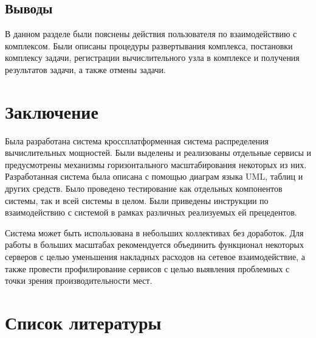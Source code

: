 \documentclass[a4paper,12pt]{report}
\numberwithin{equation}{section}
\begin{document}
  \subsection{Выводы}
  В данном разделе были пояснены действия пользователя по взаимодействию с комплексом. 
  Были описаны процедуры развертывания комплекса, постановки комплексу задачи, регистрации вычислительного узла в комплексе и получения результатов задачи, а также отмены задачи.
  
  \clearpage
  \section{Заключение}
  Была разработана система кроссплатформенная система распределения вычислительных мощностей. 
  Были выделены и реализованы отдельные сервисы и предусмотрены механизмы горизонтального масштабирования некоторых из них. 
  Разработанная система была описана с помощью диаграм языка UML, таблиц и других средств.
  Было проведено тестирование как отдельных компонентов системы, так и всей системы в целом.
  Были приведены инструкции по взаимодействию с системой в рамках различных реализуемых ей прецедентов.
  
  Система может быть использована в небольших коллективах без доработок.
  Для работы в больших масштабах рекомендуется объединить функционал некоторых серверов с целью уменьшения накладных расходов на сетевое взаимодействие, а также провести профилирование сервисов с целью выявления проблемных с точки зрения производительности мест.
  
  \clearpage
  \section*{Список литературы}
  \printbibliography[heading=none]  
  
\end{document}
